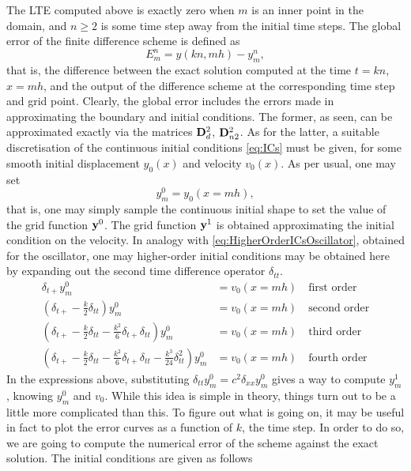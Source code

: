 \documentclass[11pt,twoside,a4paper,english]{book}
\newcommand{\dss}{\delta_{xx}}
\newcommand{\dtp}{\delta_{t+}}
\newcommand{\dtt}{\delta_{tt}}
\begin{document}
The LTE computed above is exactly zero when $m$ is an inner point in the domain, and $n \geq 2$ is some time step away from the initial time steps. The global error of the finite difference scheme is defined as
\begin{equation}\label{eq:ErrWaveEqn}
E^n_m = y(kn,mh)-y^n_m,
\end{equation}
that is, the difference between the exact solution computed at the time $t=kn$, $x=mh$, and the output of the difference scheme at the corresponding time step and grid point. Clearly, the global error includes the errors made in approximating the boundary and initial conditions. The former, as seen, can be approximated exactly via the matrices ${\bf D}^2_{d}$, ${\bf D}^2_{n2}$. As for the latter, a suitable discretisation of the continuous initial conditions \eqref{eq:ICs} must be given, for some smooth initial displacement $y_0(x)$ and velocity $v_0(x)$. As per usual, one may set
\begin{equation}\label{eq:y0m}
y^0_m = y_0(x=mh),
\end{equation}
that is, one may simply sample the continuous initial shape to set the value of the grid function ${\bf y}^0$. The grid function ${\bf y}^1$ is obtained approximating the initial condition on the velocity. In analogy with \eqref{eq:HigherOrderICsOscillator}, obtained for the oscillator, one may higher-order initial conditions may be obtained here by expanding out the second time difference operator $\dtt$. 
\begin{subequations}\label{eq:HigherOrderICsWE}
\begin{align}
\dtp y^0_m &= v_0(x=mh) \quad \text{first order} \label{eq:HigherOrderICsWE1}\\
\left(\dtp -\frac{k}{2}\dtt \right) y^0_m &= v_0(x=mh) \quad \text{second order} \label{eq:HigherOrderICsWE2}\\
\left(\dtp -\frac{k}{2}\dtt - \frac{k^2}{6}\dtp \dtt \right) y^0_m &= v_0(x=mh) \quad \text{third order}\label{eq:HigherOrderICsWE3}\\
\left(\dtp -\frac{k}{2}\dtt - \frac{k^2}{6}\dtp \dtt - \frac{k^3}{24}\dtt^2 \right) y^0_m &= v_0(x=mh) \quad \text{fourth order}\label{eq:HigherOrderICsWE4}
\end{align}
\end{subequations}
In the expressions above, substituting $\dtt y^0_m = c^2 \dss y^0_m$ gives a way to compute $y^1_m$, knowing $y^0_m$ and $v_0$. While this idea is simple in theory, things turn out to be a little more complicated than this. To figure out what is going on, it may be useful in fact to plot the error curves as a function of $k$, the time step. In order to do so, we are going to compute the numerical error of the scheme against the exact solution. The initial conditions are given as follows
\end{document}
